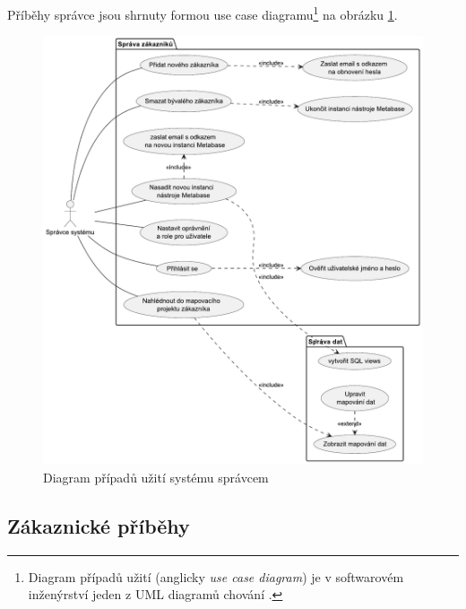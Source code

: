 Příběhy správce jsou shrnuty formou use case diagramu\footnote{
Diagram případů užití (anglicky \textit{use case diagram}) je v softwarovém inženýrství jeden z UML diagramů chování \cite{useCaseDiagWiki:online}.
}
na obrázku \ref{fig:admin-use-cases}.
\begin{figure}
    \centering
    \includegraphics[width=\linewidth]{img/Use Case Diagram - Správce systému (1).pdf}
    \caption{Diagram případů užití systému správcem}
    \label{fig:admin-use-cases}
\end{figure}

\subsection{Zákaznické příběhy}

